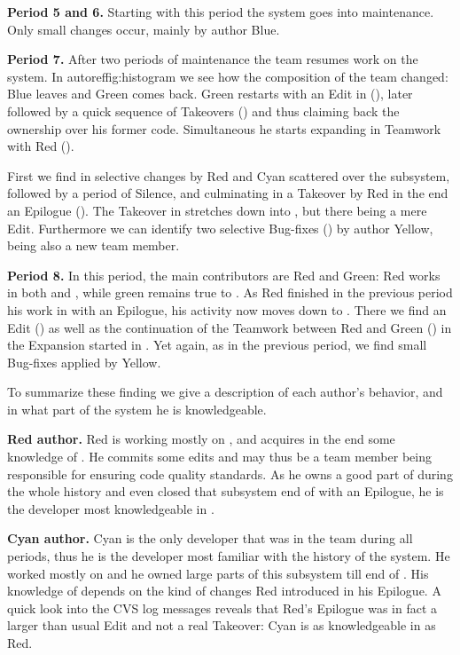 \documentclass[10pt]{book}
\begin{document}
\textbf{Period 5 and 6.} Starting with this period the system goes into maintenance. Only small changes occur, mainly by author Blue.

\textbf{Period 7.} After two periods of maintenance the team resumes work on the system. In autoref{fig:histogram} we see how the composition of the team changed: Blue leaves and Green comes back. Green restarts with an Edit in  (), later followed by a quick sequence of Takeovers () and thus claiming back the ownership over his former code. Simultaneous he starts expanding  in Teamwork with Red ().

First we find in  selective changes by Red and Cyan scattered over the subsystem, followed by a period of Silence, and culminating in a Takeover by Red in the end \ie an Epilogue (). The Takeover in  stretches down into , but there being a mere Edit. Furthermore we can identify two selective Bug-fixes () by author Yellow, being also a new team member.

\textbf{Period 8.} In this period, the main contributors are Red and Green: Red works in both  and , while green remains true to . As Red finished in the previous period his work in  with an Epilogue, his activity now moves down to . There we find an Edit () as well as the continuation of the Teamwork between Red and Green () in the Expansion started in . Yet again, as in the previous period, we find small Bug-fixes applied by Yellow.

To summarize these finding we give a description of each author's behavior, and in what part of the system he is knowledgeable.

\textbf{Red author.} Red is working mostly on , and acquires in the end some knowledge of . He commits some edits and may thus be a team member being responsible for ensuring code quality standards. As he owns a good part of  during the whole history and even closed that subsystem end of  with an Epilogue, he is the developer most knowledgeable in .

\textbf{Cyan author.} Cyan is the only developer that was in the team during all periods, thus he is the developer most familiar with the history of the system. He worked mostly on  and he owned large parts of this subsystem till end of . His knowledge of  depends on the kind of changes Red introduced in his Epilogue. A quick look into the CVS log messages reveals that Red's Epilogue was in fact a larger than usual Edit and not a real Takeover: Cyan is as knowledgeable in  as Red.
\end{document}
